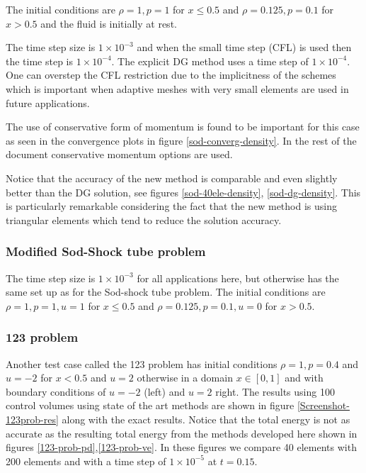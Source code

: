 The initial conditions are $\rho=1, p=1$ for $x\le 0.5$
and $\rho=0.125, p=0.1$ for $x> 0.5$ and the fluid
is initially at rest.

The time step size is $1\times 10^{-3}$ and when the
small time step (CFL) is used then the
time step is $1\times 10^{-4}$. The explicit DG method
uses a time step of  $1\times 10^{-4}$.
One can overstep the CFL restriction due to the implicitness
of the schemes which is important when adaptive meshes
with very small elements
are used in future applications.

The use of conservative form of momentum is found to be important
for this case as seen in the convergence plots
in figure \ref{sod-converg-density}.
In the rest of the document conservative momentum options
are used.

Notice that the accuracy of the new method is comparable
and even slightly better than the DG solution, see figures
\ref{sod-40ele-density}, \ref{sod-dg-density}. This is
particularly remarkable considering the fact that the new
method is using triangular elements which tend to reduce
the solution accuracy.

\subsubsection{Modified Sod-Shock tube problem}

The time step size is $1\times 10^{-3}$ for all applications
here, but otherwise has the same set up as for the Sod-shock tube problem.
The initial conditions are $\rho=1, p=1, u=1$ for $x\le 0.5$
and $\rho=0.125, p=0.1, u=0$ for $x> 0.5$.

\subsubsection{123 problem}

Another test case called the 123 problem has initial
conditions $\rho=1, p=0.4$ and $u=-2$ for $x< 0.5$ and
$u=2$ otherwise in a domain
$x \in [0,1]$
and
with boundary conditions of $u=-2$ (left) and $u=2$ right.
The results using 100 control volumes using state
of the art methods are shown in
figure \ref{Screenshot-123prob-res} along with the
exact results. Notice that the total energy is
not as accurate as the resulting total
energy from the methods developed here shown in figures
\ref{123-prob-pd},\ref{123-prob-ve}. In these figures we
compare 40 elements with 200 elements and with a time step of $1\times 10^{-5}$
at $t=0.15$.



